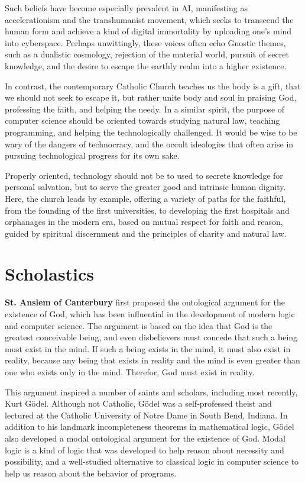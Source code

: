 \documentclass[sigplan,nonacm]{acmart}\settopmatter{printfolios=false,printccs=false,printacmref=false}
\begin{document}
  Such beliefs have become especially prevalent in AI, manifesting as accelerationism and the transhumanist movement, which seeks to transcend the human form and achieve a kind of digital immortality by uploading one's mind into cyberspace. Perhaps unwittingly, these voices often echo Gnostic themes, such as a dualistic cosmology, rejection of the material world, pursuit of secret knowledge, and the desire to escape the earthly realm into a higher existence.

  In contrast, the contemporary Catholic Church teaches us the body is a gift, that we should not seek to escape it, but rather unite body and soul in praising God, professing the faith, and helping the needy. In a similar spirit, the purpose of computer science should be oriented towards studying natural law, teaching programming, and helping the technologically challenged. It would be wise to be wary of the dangers of technocracy, and the occult ideologies that often arise in pursuing technological progress for its own sake.

  Properly oriented, technology should not be to used to secrete knowledge for personal salvation, but to serve the greater good and intrinsic human dignity. Here, the church leads by example, offering a variety of paths for the faithful, from the founding of the first universities, to developing the first hospitals and orphanages in the modern era, based on mutual respect for faith and reason, guided by spiritual discernment and the principles of charity and natural law.

  \section{Scholastics}

  \textbf{St. Anslem of Canterbury} first proposed the ontological argument for the existence of God, which has been influential in the development of modern logic and computer science. The argument is based on the idea that God is the greatest conceivable being, and even disbelievers must concede that such a being must exist in the mind. If such a being exists in the mind, it must also exist in reality, because any being that exists in reality and the mind is even greater than one who exists only in the mind. Therefor, God must exist in reality.

  This argument inspired a number of saints and scholars, including most recently, Kurt G\"odel. Although not Catholic, G\"odel was a self-professed theist and lectured at the Catholic University of Notre Dame in South Bend, Indiana. In addition to his landmark incompleteness theorems in mathematical logic, G\"odel also developed a modal ontological argument for the existence of God. Modal logic is a kind of logic that was developed to help reason about necessity and possibility, and a well-studied alternative to classical logic in computer science to help us reason about the behavior of programs.
\end{document}
